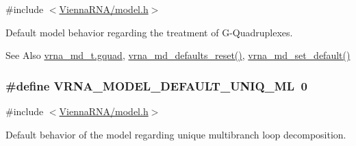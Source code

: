 {\ttfamily \#include $<$\hyperlink{model_8h}{Vienna\-R\-N\-A/model.\-h}$>$}



Default model behavior regarding the treatment of G-\/\-Quadruplexes. 

\begin{DoxySeeAlso}{See Also}
\hyperlink{group__model__details_af88a511a2b1f526b4c6213de6cb8fd6e}{vrna\-\_\-md\-\_\-t.\-gquad}, \hyperlink{group__model__details_ga70834424cf804d149937de89f80ceb45}{vrna\-\_\-md\-\_\-defaults\-\_\-reset()}, \hyperlink{group__model__details_ga8ac6ff84936282436f822644bf841f66}{vrna\-\_\-md\-\_\-set\-\_\-default()} 
\end{DoxySeeAlso}
\hypertarget{group__model__details_ga63f6006a02ba2d89148441f406c309e7}{
\subsubsection[{V\-R\-N\-A\-\_\-\-M\-O\-D\-E\-L\-\_\-\-D\-E\-F\-A\-U\-L\-T\-\_\-\-U\-N\-I\-Q\-\_\-\-M\-L}]{\setlength{\rightskip}{0pt plus 5cm}\#define V\-R\-N\-A\-\_\-\-M\-O\-D\-E\-L\-\_\-\-D\-E\-F\-A\-U\-L\-T\-\_\-\-U\-N\-I\-Q\-\_\-\-M\-L~0}}\label{group__model__details_ga63f6006a02ba2d89148441f406c309e7}


{\ttfamily \#include $<$\hyperlink{model_8h}{Vienna\-R\-N\-A/model.\-h}$>$}



Default behavior of the model regarding unique multibranch loop decomposition. 

